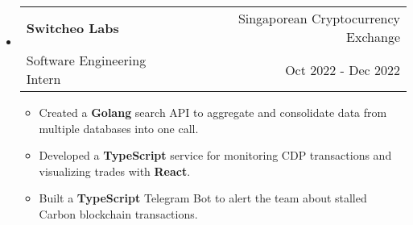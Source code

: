 \documentclass[letterpaper, 11pt]{article}
\makeatletter
\newcommand{\ResumeEntryTSDL}[4]{
  \vspace{1pt}\item
    \begin{tabular*}{\textwidth}[t]{l@{\extracolsep{\fill}}r} 
      \textbf{#1} & #2 \\
      #3 & #4 \\
    \end{tabular*}\vspace{-2.835pt} %
}
\newcommand{\ResumeItem}[2]{
  \item{
    \textbf{#1}{: #2 \vspace{-2.835pt}}
  }
}
\newcommand{\ResumeItemDefault}[1]{
  \item{
    #1 \vspace{-2.835pt}
  }
}
\newcommand{\ResumeEntryStart}{\begin{itemize}[leftmargin=0mm, label={}]}
\newcommand{\ResumeEntryEnd}{\end{itemize}\vspace{-2.835pt}} %
\newcommand{\ResumeItemListStart}{\begin{itemize}[leftmargin=5mm, label=$\bullet$, itemsep=1mm, parsep=1mm]} %
\newcommand{\ResumeItemListEnd}{\end{itemize}}
\makeatother
\begin{document}
  \ResumeEntryStart
    \ResumeEntryTSDL{Switcheo Labs}{Singaporean Cryptocurrency Exchange}{Software Engineering Intern}{Oct 2022 - Dec 2022}
    \ResumeItemListStart
    \ResumeItemDefault{Created a \textbf{Golang} search API to aggregate and consolidate data from multiple databases into one call.}
    \ResumeItemDefault{Developed a \textbf{TypeScript} service for monitoring CDP transactions and visualizing trades with \textbf{React}.}
    \ResumeItemDefault{Built a \textbf{TypeScript} Telegram Bot to alert the team about stalled Carbon blockchain transactions.}
    \ResumeItemListEnd
  \ResumeEntryEnd

\end{document}
